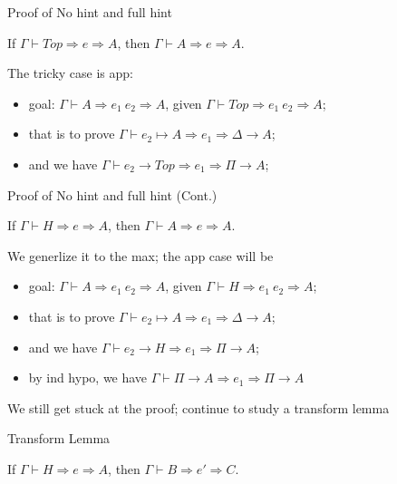 \documentclass[compress,10pt,aspectratio=169]{beamer}
\begin{document}
\begin{frame}{Proof of No hint and full hint}
\begin{lemma}
If $\Gamma \vdash Top \Rightarrow e \Rightarrow A$, then $\Gamma \vdash A \Rightarrow e \Rightarrow A$.
\end{lemma}
The tricky case is app:
\begin{itemize}
	\item goal: $\Gamma \vdash A \Rightarrow e_1~e_2 \Rightarrow A$, given $\Gamma \vdash Top \Rightarrow e_1~e_2 \Rightarrow A$;
	\item that is to prove $\Gamma \vdash \boxed{e_2} \mapsto A \Rightarrow e_1 \Rightarrow \Delta \rightarrow A$;
	\item and we have $\Gamma \vdash \boxed{e_2} \rightarrow Top \Rightarrow e_1 \Rightarrow \Pi \rightarrow A$;
\end{itemize}
\end{frame}

\begin{frame}{Proof of No hint and full hint (Cont.)}
\begin{lemma}
If $\Gamma \vdash H \Rightarrow e \Rightarrow A$, then $\Gamma \vdash A \Rightarrow e \Rightarrow A$.
\end{lemma}

We generlize it to the max; the app case will be
\begin{itemize}
	\item goal: $\Gamma \vdash A \Rightarrow e_1~e_2 \Rightarrow A$, given $\Gamma \vdash H \Rightarrow e_1~e_2 \Rightarrow A$;
	\item that is to prove $\Gamma \vdash \boxed{e_2} \mapsto A \Rightarrow e_1 \Rightarrow \Delta \rightarrow A$;
	\item and we have $\Gamma \vdash \boxed{e_2} \rightarrow H \Rightarrow e_1 \Rightarrow \Pi \rightarrow A$;
	\item by ind hypo, we have $\Gamma \vdash \Pi \rightarrow A \Rightarrow e_1 \Rightarrow \Pi \rightarrow A$
\end{itemize}

We still get stuck at the proof; continue to study a transform lemma
\end{frame}

\begin{frame}{Transform Lemma}
\begin{lemma}
If $\Gamma \vdash H \Rightarrow e \Rightarrow A$, then $\Gamma \vdash B \Rightarrow e' \Rightarrow	C$.
\end{lemma}
	
\end{frame}
\end{document}

